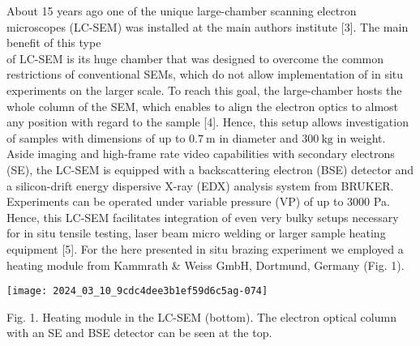 \documentclass[10pt]{article}
\begin{document}
About 15 years ago one of the unique large-chamber scanning electron microscopes (LC-SEM) was installed at the main authors institute [3]. The main benefit of this type\\
of LC-SEM is its huge chamber that was designed to overcome the common restrictions of conventional SEMs, which do not allow implementation of in situ experiments on the larger scale. To reach this goal, the large-chamber hosts the whole column of the SEM, which enables to align the electron optics to almost any position with regard to the sample [4]. Hence, this setup allows investigation of samples with dimensions of up to $0.7 \mathrm{~m}$ in diameter and $300 \mathrm{~kg}$ in weight. Aside imaging and high-frame rate video capabilities with secondary electrons (SE), the LC-SEM is equipped with a backscattering electron (BSE) detector and a silicon-drift energy dispersive X-ray (EDX) analysis system from BRUKER. Experiments can be operated under variable pressure (VP) of up to 3000 Pa. Hence, this LC-SEM facilitates integration of even very bulky setups necessary for in situ tensile testing, laser beam micro welding or larger sample heating equipment [5]. For the here presented in situ brazing experiment we employed a heating module from Kammrath \& Weiss GmbH, Dortmund, Germany (Fig. 1).

\begin{center}
\texttt{[image: 2024\_03\_10\_9cdc4dee3b1ef59d6c5ag-074]}
\end{center}

Fig. 1. Heating module in the LC-SEM (bottom). The electron optical column with an SE and BSE detector can be seen at the top.
\end{document}
